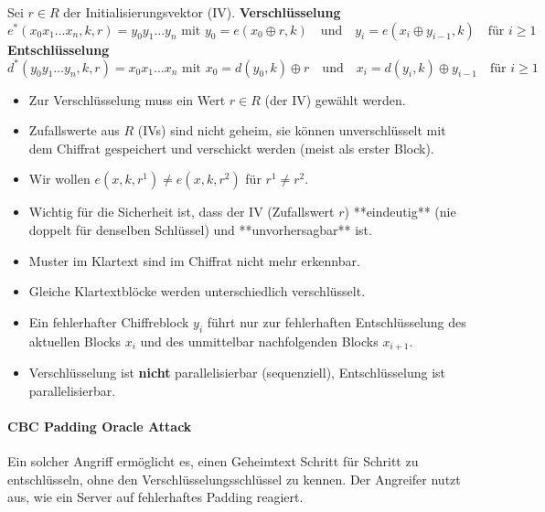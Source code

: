 \documentclass[
../../css_summary.tex,
]
{subfiles}
\begin{document}
Sei $r \in R$ der Initialisierungsvektor (IV).
\textbf{Verschlüsselung}
\[ e^*(x_0 x_1 \dots x_n, k, r) = y_0 y_1 \dots y_n \text{ mit } y_0 = e(x_0 \oplus r, k) \quad \text{und} \quad y_i = e(x_i \oplus y_{i-1}, k) \quad \text{für } i \ge 1 \]
\textbf{Entschlüsselung}
\[ d^*(y_0 y_1 \dots y_n, k, r) = x_0 x_1 \dots x_n \text{ mit } x_0 = d(y_0, k) \oplus r \quad \text{und} \quad x_i = d(y_i, k) \oplus y_{i-1} \quad \text{für } i \ge 1
\]

\begin{itemize}
   \item Zur Verschlüsselung muss ein Wert $r \in R$ (der IV) gewählt werden.
   \item Zufallswerte aus $R$ (IVs) sind nicht geheim, sie können unverschlüsselt mit dem Chiffrat gespeichert und verschickt werden (meist als erster Block).
   \item Wir wollen $e(x, k, r^1) \neq e(x, k, r^2) $ für $r^1 \neq r^2$.
   \item Wichtig für die Sicherheit ist, dass der IV (Zufallswert $r$) **eindeutig** (nie doppelt für denselben Schlüssel) und **unvorhersagbar** ist.
   \item Muster im Klartext sind im Chiffrat nicht mehr erkennbar.
   \item Gleiche Klartextblöcke werden unterschiedlich verschlüsselt.
   \item Ein fehlerhafter Chiffreblock $y_i$ führt nur zur fehlerhaften Entschlüsselung des aktuellen Blocks $x_i$ und des unmittelbar nachfolgenden Blocks $x_{i+1}$.
   \item Verschlüsselung ist \textbf{nicht} parallelisierbar (sequenziell), Entschlüsselung ist parallelisierbar.
\end{itemize}

\paragraph{CBC Padding Oracle Attack}



Ein solcher Angriff ermöglicht es, einen Geheimtext Schritt für Schritt zu entschlüsseln, ohne den Verschlüsselungsschlüssel zu kennen. Der Angreifer nutzt aus, wie ein Server auf fehlerhaftes Padding reagiert.
\end{document}
